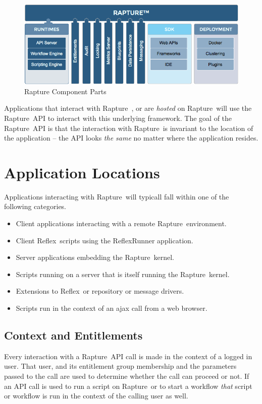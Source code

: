 \documentclass[12pt,twoside,a4paper]{book}
\newcommand{\Rapture}{Rapture~}
\newcommand{\Reflex}{Reflex~}
\begin{document}
\begin{figure}[htb]
\centering
\includegraphics[width=15cm]{Graphics/rapturecore}
\caption{Rapture Component Parts}
\label{fig:RaptureDiagram}
\end{figure}

Applications that interact with \Rapture, or are \emph{hosted} on \Rapture will
use the \Rapture API to interact with this underlying framework. The goal of
the \Rapture API is that the interaction with \Rapture is invariant to the location
of the application -- the API looks \emph{the same} no matter where the application
resides.

\chapter{Application Locations}
Applications interacting with \Rapture will typicall fall within one of the
following categories.

\begin{itemize}
  \item{Client applications interacting with a remote \Rapture environment.}
  \item{Client \Reflex scripts using the ReflexRunner application.}
  \item{Server applications embedding the \Rapture kernel.}
  \item{Scripts running on a server that is itself running the \Rapture kernel.}
  \item{Extensions to \Reflex or repository or message drivers.}
  \item{Scripts run in the context of an ajax call from a web browser.}
\end{itemize}

\section{Context and Entitlements}
Every interaction with a \Rapture API call is made in the context of a logged in
user. That user, and its entitlement group membership and the parameters passed
to the call are used to determine whether the call can proceed or not. If an
API call is used to run a script on \Rapture or to start a workflow \emph{that} script
or workflow is run in the context of the calling user as well.
\end{document}
